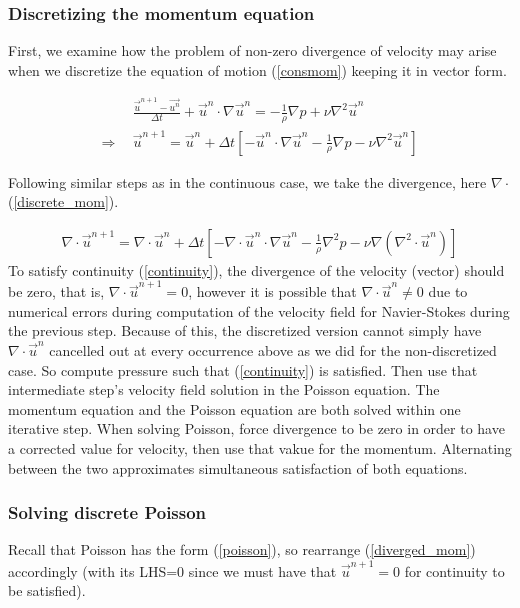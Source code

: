 \documentclass[11pt]{article}
\begin{document}
{\subsubsection{Discretizing the momentum equation}
First, we examine how the problem of non-zero divergence of velocity may arise when we
discretize the equation of motion (\ref{consmom}) keeping it in vector form.

\begin{align}
& \frac{\vec{u}^{n+1} - \vec{u^n}}{\Delta t} + \vec{u}^n \cdot \nabla \vec{u}^n
 = -\frac{1}{\rho} \nabla p + \nu \nabla^2 \vec{u}^n \nonumber \\
\Rightarrow ~~&
\vec{u}^{n+1} = \vec{u}^n + \Delta t \left[ -\vec{u}^n \cdot \nabla \vec{u}^n
			  - \frac{1}{\rho} \nabla p - \nu \nabla^2 \vec{u}^n \right]
\label{discrete_mom}
\end{align}

Following similar steps as in the continuous case, we take the divergence,
here $\nabla \cdot$(\ref{discrete_mom}).

\begin{align}
\nabla \cdot \vec{u}^{n+1} = \nabla \cdot \vec{u}^n
 + \Delta t \left[ -\nabla \cdot \vec{u}^n \cdot \nabla \vec{u}^n
			      - \frac{1}{\rho} \nabla^2 p - \nu \nabla (\nabla^2 \cdot \vec{u}^n) \right]
\label{diverged_mom}
\end{align}
To satisfy continuity (\ref{continuity}), the divergence of the velocity (vector) should
be zero, that is, $\nabla \cdot \vec{u}^{n+1}=0$, however it is possible that $\nabla \cdot \vec{u}^n \neq 0$ due to numerical errors during computation of the velocity field for
Navier-Stokes during the previous step. Because of this, the discretized version cannot simply
have $\nabla \cdot \vec{u}^n$ cancelled out at every occurrence above as we did for the
non-discretized case. So compute pressure such that (\ref{continuity}) is satisfied.
Then use that intermediate step's velocity field solution in the Poisson equation.
The momentum equation and the Poisson equation are both solved within one iterative step.
When solving Poisson, force divergence to be zero in order to have a corrected value for
velocity, then use that vakue for the momentum. Alternating between the two approximates
simultaneous satisfaction of both equations.

\subsubsection{Solving discrete Poisson}
Recall that Poisson has the form (\ref{poisson}), so rearrange (\ref{diverged_mom})
accordingly (with its LHS=0 since we must have that $\vec{u}^{n+1} = 0$ for continuity
to be satisfied).

}
\end{document}
